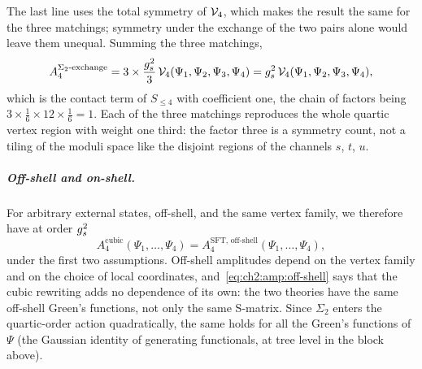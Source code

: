 The last line uses the total symmetry of $\mathcal{V}_{4}$, which makes the result the same for the three matchings; symmetry under the exchange of the two pairs alone would leave them unequal.
Summing the three matchings,
\begin{equation}
  \label{eq:ch2:amp:sum}
  A_4^{\Sigma_2\text{-exchange}}
    = 3 \times \frac{g_s^2}{3} \, \mathcal{V}_{4}(\Psi_1, \Psi_2, \Psi_3, \Psi_4)
    = g_s^2 \, \mathcal{V}_{4}(\Psi_1, \Psi_2, \Psi_3, \Psi_4),
\end{equation}
which is the contact term of $S_{\le 4}$ with coefficient one, the chain of factors being $3 \times \tfrac16 \times 12 \times \tfrac16 = 1$.
Each of the three matchings reproduces the whole quartic vertex region with weight one third: the factor three is a symmetry count, not a tiling of the moduli space like the disjoint regions of the channels $s$, $t$, $u$.

\subparagraph{Off-shell and on-shell.}
For arbitrary external states, off-shell, and the same vertex family, we therefore have at order $g_s^2$
\begin{equation}
  \label{eq:ch2:amp:off-shell}
  A_4^{\text{cubic}}(\Psi_1, \ldots, \Psi_4)
    = A_4^{\text{SFT, off-shell}}(\Psi_1, \ldots, \Psi_4),
\end{equation}
under the first two assumptions.
Off-shell amplitudes depend on the vertex family and on the choice of local coordinates, and~\eqref{eq:ch2:amp:off-shell} says that the cubic rewriting adds no dependence of its own: the two theories have the same off-shell Green's functions, not only the same S-matrix.
Since $\Sigma_2$ enters the quartic-order action quadratically, the same holds for all the Green's functions of $\Psi$ (the Gaussian identity of generating functionals, at tree level in the block above).

